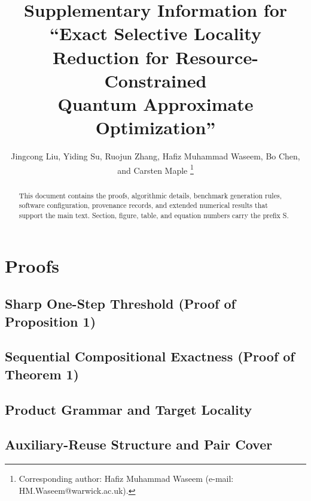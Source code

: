 \documentclass[journal,onecolumn,11pt]{IEEEtran}
\theoremstyle{plain}
\begin{document}
\title{Supplementary Information for\\
``Exact Selective Locality Reduction for Resource-Constrained\\
Quantum Approximate Optimization''}

\author{Jingcong Liu, Yiding Su, Ruojun Zhang, Hafiz Muhammad Waseem, Bo Chen,
and Carsten Maple%
\thanks{Corresponding author: Hafiz Muhammad Waseem (e-mail: HM.Waseem@warwick.ac.uk).}}

\maketitle

\begin{abstract}
This document contains the proofs, algorithmic details, benchmark generation rules,
software configuration, provenance records, and extended numerical results that
support the main text. Section, figure, table, and equation numbers carry the prefix S.
\end{abstract}

\tableofcontents

\section{Proofs}
\label{sup:proofs}

\subsection{Sharp One-Step Threshold (Proof of Proposition 1)}
\label{sup:proofs:sharp}

\subsection{Sequential Compositional Exactness (Proof of Theorem 1)}
\label{sup:proofs:composition}

\subsection{Product Grammar and Target Locality}
\label{sup:proofs:grammar}

\subsection{Auxiliary-Reuse Structure and Pair Cover}
\label{sup:proofs:reuse}
\end{document}
